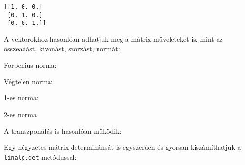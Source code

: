 \begin{python}

\end{python}

\begin{verbatim}
[[1. 0. 0.]
 [0. 1. 0.]
 [0. 0. 1.]]
\end{verbatim}

    A vektorokhoz hasonlóan adhatjuk meg a mátrix műveleteket is, mint az
összeadást, kivonást, szorzást, normát:

\begin{python}

\end{python}

\begin{python}

\end{python}

\begin{python}

\end{python}

    Forbenius norma:

\begin{python}

\end{python}

    Végtelen norma:

\begin{python}

\end{python}

    1-es norma:

\begin{python}

\end{python}

    2-es norma

\begin{python}

\end{python}

    A transzponálás is hasonlóan működik:

\begin{python}

\end{python}

\begin{python}

\end{python}

    Egy négyzetes mátrix determinánsát is egyszerűen és gyorsan
kiszámíthatjuk a \texttt{linalg.det} metódussal:

